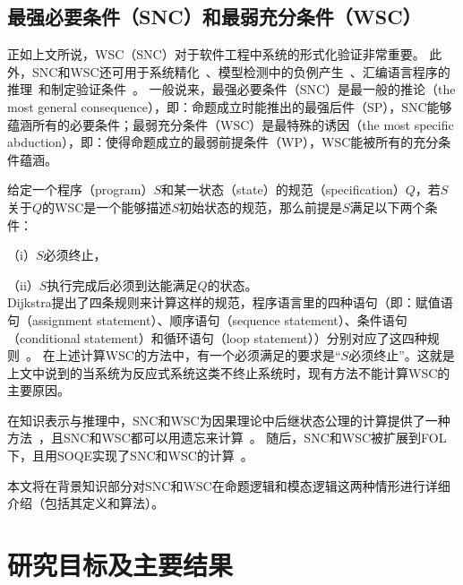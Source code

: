 \subsection{最强必要条件（SNC）和最弱充分条件（WSC）}


正如上文所说，WSC（SNC）对于软件工程中系统的形式化验证非常重要。
此外，SNC和WSC还可用于系统精化~\cite{woodcock1990refinement}、模型检测中的负例产生~\cite{dailler2018instrumenting}、汇编语言程序的推理~\cite{legato2002weakest}和制定验证条件~\cite{DBLP:journals/ipl/Leino05}。
一般说来，最强必要条件（SNC）是最一般的推论（the most general consequence），即：命题成立时能推出的最强后件（SP），SNC能够蕴涵所有的必要条件；最弱充分条件（WSC）是最特殊的诱因（the most specific abduction），即：使得命题成立的最弱前提条件（WP），WSC能被所有的充分条件蕴涵。

给定一个程序（program）$S$和某一状态（state）的规范（specification）$Q$，若$S$关于$Q$的WSC是一个能够描述$S$初始状态的规范，那么前提是$S$满足以下两个条件：

（i）$S$必须终止，

（ii）$S$执行完成后必须到达能满足$Q$的状态。\\
Dijkstra提出了四条规则来计算这样的规范，程序语言里的四种语句（即：赋值语句（assignment statement）、顺序语句（sequence statement）、条件语句（conditional statement）和循环语句（loop statement））分别对应了这四种规则~\cite{DBLP:journals/cacm/Dijkstra75}。
在上述计算WSC的方法中，有一个必须满足的要求是“$S$必须终止”。这就是上文中说到的当系统为反应式系统这类不终止系统时，现有方法不能计算WSC的主要原因。



在知识表示与推理中，SNC和WSC为因果理论中后继状态公理的计算提供了一种方法~\cite{DBLP:journals/jair/Lin03}，且SNC和WSC都可以用遗忘来计算~\cite{DBLP:journals/ai/Lin01,DBLP:conf/ijcai/DohertyLS01}。
随后，SNC和WSC被扩展到FOL下，且用SOQE实现了SNC和WSC的计算~\cite{DBLP:conf/ijcai/DohertyLS01}。

本文将在背景知识部分对SNC和WSC在命题逻辑和模态逻辑这两种情形进行详细介绍（包括其定义和算法）。






\section{研究目标及主要结果}

